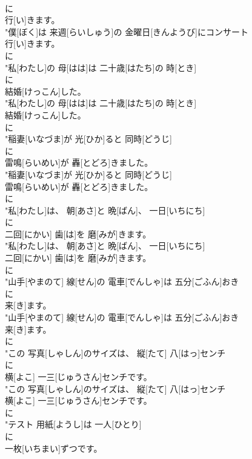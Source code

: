 \documentclass[8pt]{extreport}
\begin{document}
\begin{CJK}{UTF8}{min}
\\	に
\\	行[い]きます。
\\	"僕[ぼく]は 来週[らいしゅう]の 金曜日[きんようび]にコンサート
\\	行[い]きます。
\\	に
\\	"私[わたし]の 母[はは]は 二十歳[はたち]の 時[とき]
\\	に
\\	結婚[けっこん]した。
\\	"私[わたし]の 母[はは]は 二十歳[はたち]の 時[とき]
\\	結婚[けっこん]した。
\\	に
\\	"稲妻[いなづま]が 光[ひか]ると 同時[どうじ]
\\	に
\\	雷鳴[らいめい]が 轟[とどろ]きました。
\\	"稲妻[いなづま]が 光[ひか]ると 同時[どうじ]
\\	雷鳴[らいめい]が 轟[とどろ]きました。
\\	に
\\	"私[わたし]は、 朝[あさ]と 晩[ばん]、 一日[いちにち]
\\	に
\\	二回[にかい] 歯[は]を 磨[みが]きます。
\\	"私[わたし]は、 朝[あさ]と 晩[ばん]、 一日[いちにち]
\\	二回[にかい] 歯[は]を 磨[みが]きます。
\\	に
\\	"山手[やまのて] 線[せん]の 電車[でんしゃ]は 五分[ごふん]おき
\\	に
\\	来[き]ます。
\\	"山手[やまのて] 線[せん]の 電車[でんしゃ]は 五分[ごふん]おき
\\	来[き]ます。
\\	に
\\	"この 写真[しゃしん]のサイズは、 縦[たて] 八[はっ]センチ
\\	に
\\	横[よこ] 一三[じゅうさん]センチです。
\\	"この 写真[しゃしん]のサイズは、 縦[たて] 八[はっ]センチ
\\	横[よこ] 一三[じゅうさん]センチです。
\\	に
\\	"テスト 用紙[ようし]は 一人[ひとり]
\\	に
\\	一枚[いちまい]ずつです。

\end{CJK}
\end{document}

